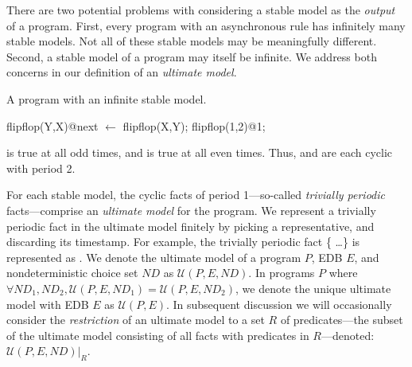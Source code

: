 There are two potential problems with considering a stable model as the {\em output} of a \lang program.  First, every program with an asynchronous rule has infinitely many stable models.  Not all of these stable models may be meaningfully different.  Second, a stable model of a \lang program may itself be infinite.  We address both concerns in our definition of an {\em ultimate model}.

\begin{example}
\label{ex:flipflop}
A \lang program with an infinite stable model.

\begin{Dedalus}
flipflop(Y,X)@next \(\leftarrow\) flipflop(X,Y);
flipflop(1,2)@1;
\end{Dedalus}

 is true at all odd times, and  is true at all even times.  Thus,  and  are each cyclic with period 2.
\end{example}



\begin{definition}
For each stable model, the cyclic facts of period 1---so-called {\em trivially periodic} facts---comprise an {\em ultimate model} for the program.  We represent a trivially periodic fact in the ultimate model finitely by picking a representative, and discarding its timestamp.
For example, the trivially periodic fact \{ \ldots\} is represented as .  We denote the ultimate model of a program $P$, EDB $E$, and nondeterministic choice set $ND$ as $\mathcal{U}(P, E, ND)$.  In programs $P$ where $\forall ND_1, ND_2, \mathcal{U}(P, E, ND_1) = \mathcal{U}(P, E, ND_2)$, we denote the unique ultimate model with EDB $E$ as $\mathcal{U}(P, E)$.  In subsequent discussion we will occasionally consider the {\em restriction} of an ultimate model to a set $R$ of predicates---the subset of the ultimate model consisting of all facts with predicates in $R$---denoted: $\mathcal{U}(P, E, ND)|_{R}$.
\end{definition}

